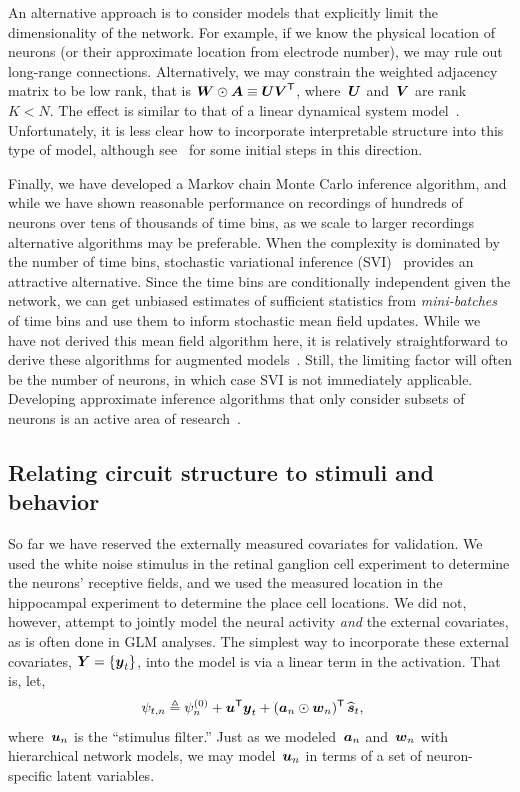 \sloppy
An alternative approach is to consider models that explicitly limit 
the dimensionality of the network. For example, if we know the 
physical location of neurons (or their approximate location from 
electrode number), we may rule out long-range connections. 
Alternatively, we may constrain the weighted adjacency matrix to be 
low rank, that is ${\boldsymbol{W} \odot \boldsymbol{A} \equiv \boldsymbol{U} \boldsymbol{V}^{\mathsf{T}}}$, where~$\boldsymbol{U}$
and~$\boldsymbol{V}$ are rank~${K < N}$. The effect is similar to that of 
a linear dynamical system model~\citep{paninski2010new, macke2011empirical}. 
Unfortunately, it is less clear how to incorporate interpretable 
structure into this type of model, although see~\citet{buesing2014clustered}
for some initial steps in this direction.


Finally, we have developed a Markov chain Monte Carlo inference algorithm,
and while we have shown reasonable performance on recordings of 
hundreds of neurons over tens of thousands of time bins, as we scale 
to larger recordings alternative algorithms may be preferable. 
When the complexity is dominated by the number of time bins, 
stochastic variational inference (SVI)~\citep{Hoffman13} provides 
an attractive alternative. Since the time bins are conditionally 
independent given the network, we can get unbiased estimates of 
sufficient statistics from \textit{mini-batches} of time bins
and use them to inform stochastic mean field updates. 
While we have not derived this mean field algorithm here, it is 
relatively straightforward to derive these algorithms for 
\polyagamma augmented models~\citep{Pillow2012, Zhou2012}. 
Still, the limiting factor will often be the number of neurons, 
in which case SVI is not immediately applicable. Developing 
approximate inference algorithms that only consider subsets of neurons is 
an active area of research~\citep{soudry2015efficient}. 

\subsection{Relating circuit structure to stimuli and behavior}
So far we have reserved the externally measured covariates for
validation.  We used the white noise stimulus in the retinal ganglion
cell experiment to determine the neurons' receptive fields, and we
used the measured location in the hippocampal experiment to determine
the place cell locations. We did not, however, attempt to jointly
model the neural activity \emph{and} the external covariates, as is
often done in GLM analyses. The simplest way to incorporate these external covariates,
${\boldsymbol{Y} = \{\boldsymbol{y}_t\}}$, into the model is via a linear term in the
activation. That is, let,
\begin{align*}
  \psi_{t,n} &\triangleq \psi_n^{(0)}  +
  \boldsymbol{u}^{\mathsf{T}} \boldsymbol{y}_t + (\boldsymbol{a}_{n} \odot \boldsymbol{w}_n)^{\mathsf{T}} \, \widehat{\boldsymbol{s}}_t,
\end{align*}
where~$\boldsymbol{u}_n$ is the ``stimulus filter.''
Just as we modeled~$\boldsymbol{a}_n$ and~$\boldsymbol{w}_n$ with hierarchical network models,
we may model~$\boldsymbol{u}_n$ in terms of a set of neuron-specific latent variables.

